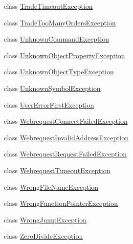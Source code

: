 \begin{DoxyCompactItemize}
\item 
class \hyperlink{class_m_q_l4_c_sharp_1_1_base_1_1_exceptions_1_1_trade_timeout_exception}{Trade\+Timeout\+Exception}
\item 
class \hyperlink{class_m_q_l4_c_sharp_1_1_base_1_1_exceptions_1_1_trade_too_many_orders_exception}{Trade\+Too\+Many\+Orders\+Exception}
\item 
class \hyperlink{class_m_q_l4_c_sharp_1_1_base_1_1_exceptions_1_1_unknown_command_exception}{Unknown\+Command\+Exception}
\item 
class \hyperlink{class_m_q_l4_c_sharp_1_1_base_1_1_exceptions_1_1_unknown_object_property_exception}{Unknown\+Object\+Property\+Exception}
\item 
class \hyperlink{class_m_q_l4_c_sharp_1_1_base_1_1_exceptions_1_1_unknown_object_type_exception}{Unknown\+Object\+Type\+Exception}
\item 
class \hyperlink{class_m_q_l4_c_sharp_1_1_base_1_1_exceptions_1_1_unknown_symbol_exception}{Unknown\+Symbol\+Exception}
\item 
class \hyperlink{class_m_q_l4_c_sharp_1_1_base_1_1_exceptions_1_1_user_error_first_exception}{User\+Error\+First\+Exception}
\item 
class \hyperlink{class_m_q_l4_c_sharp_1_1_base_1_1_exceptions_1_1_webrequest_connect_failed_exception}{Webrequest\+Connect\+Failed\+Exception}
\item 
class \hyperlink{class_m_q_l4_c_sharp_1_1_base_1_1_exceptions_1_1_webrequest_invalid_address_exception}{Webrequest\+Invalid\+Address\+Exception}
\item 
class \hyperlink{class_m_q_l4_c_sharp_1_1_base_1_1_exceptions_1_1_webrequest_request_failed_exception}{Webrequest\+Request\+Failed\+Exception}
\item 
class \hyperlink{class_m_q_l4_c_sharp_1_1_base_1_1_exceptions_1_1_webrequest_timeout_exception}{Webrequest\+Timeout\+Exception}
\item 
class \hyperlink{class_m_q_l4_c_sharp_1_1_base_1_1_exceptions_1_1_wrong_file_name_exception}{Wrong\+File\+Name\+Exception}
\item 
class \hyperlink{class_m_q_l4_c_sharp_1_1_base_1_1_exceptions_1_1_wrong_function_pointer_exception}{Wrong\+Function\+Pointer\+Exception}
\item 
class \hyperlink{class_m_q_l4_c_sharp_1_1_base_1_1_exceptions_1_1_wrong_jump_exception}{Wrong\+Jump\+Exception}
\item 
class \hyperlink{class_m_q_l4_c_sharp_1_1_base_1_1_exceptions_1_1_zero_divide_exception}{Zero\+Divide\+Exception}
\end{DoxyCompactItemize}
